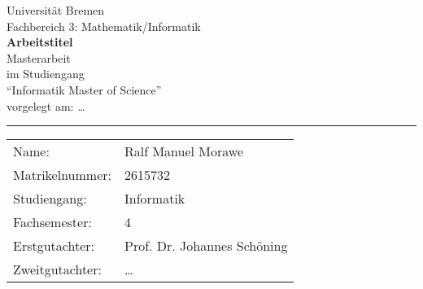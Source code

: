 \begin{titlepage}
\begin{center}
    \LARGE Universität Bremen\\
    \large Fachbereich 3: Mathematik/Informatik\\
    \vspace{2cm}
    \LARGE\textsf{\textbf{Arbeitstitel}} \\
    \vspace{2cm}
    \LARGE Masterarbeit\\
    \vspace{0.5cm}
    \large
    im Studiengang\\
    \enquote{Informatik Master of Science}\\
    \vspace{1cm}
    \normalsize
    vorgelegt am: \dots \\
    \vspace{3.5cm}
\end{center}
\vfill
\noindent
\hrule
\vspace{1em}
\begin{tabular}{ll}
    Name: & {Ralf Manuel Morawe} \\
    Matrikelnummer: & {2615732} \\
    Studiengang: & Informatik\\
    Fachsemester: & 4\\
    Erstgutachter: & {Prof. Dr. Johannes Schöning} \\
    Zweitgutachter: & {\dots}
\end{tabular}
\end{titlepage}
\cleardoublepage
